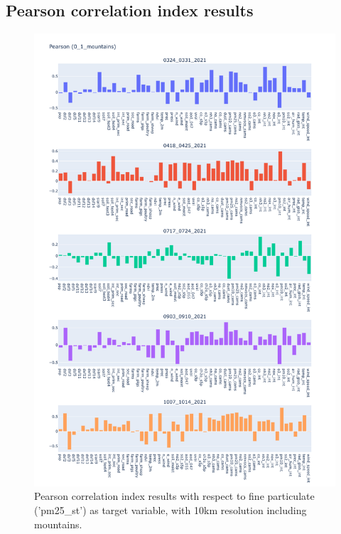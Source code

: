 \subsection{Pearson correlation index results}
\begin{figure}[H]
    \centering
    \includegraphics[scale=0.35]{images/tests/0_1_mountainspm25_st_pearson.png}
    \caption{Pearson correlation index results with respect to fine particulate ('pm25\_st') as target variable, with 10km resolution including mountains.}
\end{figure}
